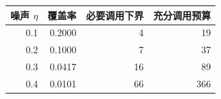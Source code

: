 \begin{tabular}{rrrr}
\toprule
噪声 $\eta$ & 覆盖率 & 必要调用下界 & 充分调用预算\\
\midrule
0.1 & 0.2000 & 4 & 19\\
0.2 & 0.1000 & 7 & 37\\
0.3 & 0.0417 & 16 & 89\\
0.4 & 0.0101 & 66 & 366\\
\bottomrule
\end{tabular}
